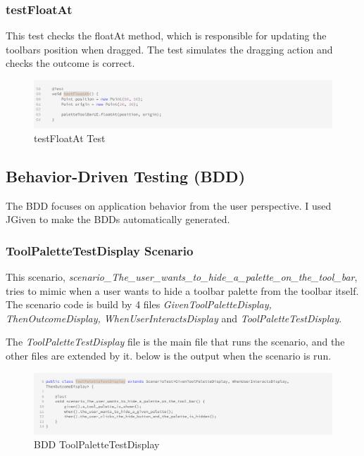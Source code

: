 \subsubsection{testFloatAt}
This test checks the floatAt method, which is responsible for updating the toolbars position when dragged.
The test simulates the dragging action and checks the outcome is correct.

\begin{figure}[H]
    \centering
    \includegraphics[width=\linewidth]{pic/Test testFloatAt.png}
    \caption{testFloatAt Test}
    \label{fig:testFloatAt Test}
\end{figure}


\subsection{Behavior-Driven Testing (BDD)}
The BDD focuses on application behavior from the user perspective. I used JGiven to make the BDDs automatically generated.

\subsubsection{ToolPaletteTestDisplay Scenario}
This scenario, \textit{scenario\_The\_user\_wants\_to\_hide\_a\_palette\_on\_the\_tool\_bar}, tries to mimic when a user wants to hide a toolbar palette from the toolbar itself.
The scenario code is build by 4 files \textit{GivenToolPaletteDisplay, ThenOutcomeDisplay, WhenUserInteractsDisplay} and \textit{ToolPaletteTestDisplay}.

The \textit{ToolPaletteTestDisplay} file is the main file that runs the scenario, and the other files are extended by it. below is the output when the scenario is run.


\begin{figure}[H]
    \centering
    \includegraphics[width=\linewidth]{pic/BDD ToolPaletteTestDisplay.png}
    \caption{BDD ToolPaletteTestDisplay}
    \label{fig:BDD ToolPaletteTestDisplay}
\end{figure}



